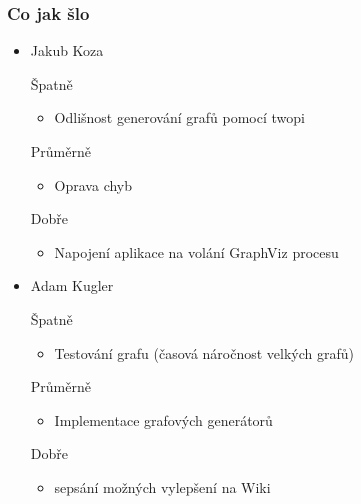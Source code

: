 \documentclass{beamer}
\begin{document}
\begin{frame}[allowframebreaks]\frametitle{Co jak šlo}
  \begin{itemize}
    \item Jakub Koza
     \begin{block}{Špatně} %
       \begin{itemize}
        \item Odlišnost generování grafů pomocí twopi
       \end{itemize}
     \end{block}
     \begin{block}{Průměrně} %
        \begin{itemize}
        \item Oprava chyb
       \end{itemize}
     \end{block}
     \begin{block}{Dobře} %
       \begin{itemize}
        \item Napojení aplikace na volání GraphViz procesu
       \end{itemize}
     \end{block}
   
    \item Adam Kugler
      \begin{block}{Špatně} %
       \begin{itemize}
        \item Testování grafu (časová náročnost velkých grafů)
       \end{itemize}
     \end{block}
     \begin{block}{Průměrně} %
        \begin{itemize}
        \item Implementace grafových generátorů
       \end{itemize}
     \end{block}
     \begin{block}{Dobře} %
       \begin{itemize}
        \item sepsání možných vylepšení na Wiki
       \end{itemize}
     \end{block}
  

\end{itemize}
\end{frame}
\end{document}
